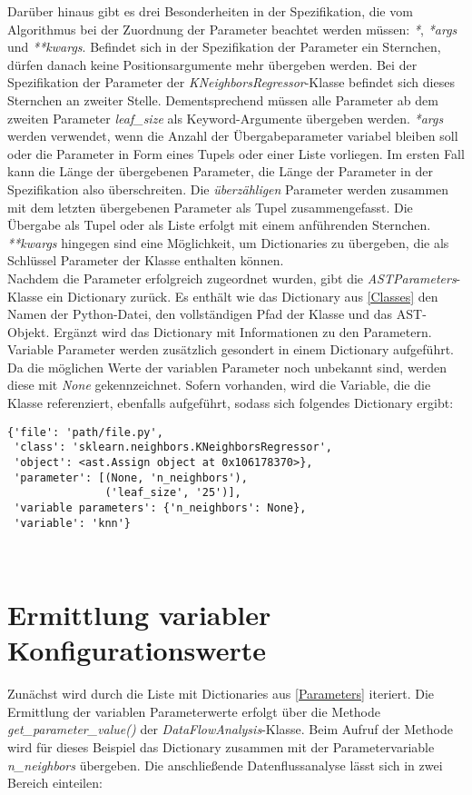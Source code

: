 \documentclass[german,bachelor]{swsLeipzig}
\begin{document}
Darüber hinaus gibt es drei Besonderheiten in der Spezifikation, die vom Algorithmus bei der Zuordnung der Parameter
beachtet werden müssen: \textit{*}, \textit{*args} und \textit{**kwargs}.
Befindet sich in der Spezifikation der Parameter ein Sternchen, dürfen danach keine Positionsargumente mehr
übergeben werden.
Bei der Spezifikation der Parameter der \textit{KNeighborsRegressor}-Klasse befindet sich dieses Sternchen an zweiter Stelle.
Dementsprechend müssen alle Parameter ab dem zweiten Parameter \textit{leaf\_size} als Keyword-Argumente übergeben werden.
\textit{*args} werden verwendet, wenn die Anzahl der Übergabeparameter variabel bleiben soll oder die Parameter in Form
eines Tupels oder einer Liste vorliegen.
Im ersten Fall kann die Länge der übergebenen Parameter, die Länge der Parameter in der Spezifikation also überschreiten.
Die \textit{überzähligen} Parameter werden zusammen mit dem letzten übergebenen Parameter als Tupel zusammengefasst.
Die Übergabe als Tupel oder als Liste erfolgt mit einem anführenden Sternchen.
\textit{**kwargs} hingegen sind eine Möglichkeit, um Dictionaries zu übergeben, die als Schlüssel Parameter der Klasse
enthalten können. \\

Nachdem die Parameter erfolgreich zugeordnet wurden, gibt die \textit{ASTParameters}-Klasse ein Dictionary zurück.
Es enthält wie das Dictionary aus \ref{Classes} den Namen der Python-Datei, den vollständigen Pfad der Klasse und das AST-Objekt.
Ergänzt wird das Dictionary mit Informationen zu den Parametern.
Variable Parameter werden zusätzlich gesondert in einem Dictionary aufgeführt.
Da die möglichen Werte der variablen Parameter noch unbekannt sind, werden diese mit \textit{None} gekennzeichnet.
Sofern vorhanden, wird die Variable, die die Klasse referenziert, ebenfalls aufgeführt, sodass sich folgendes Dictionary ergibt:\\

\begin{lstlisting}[frame=single, basicstyle=\small]
{'file': 'path/file.py',
 'class': 'sklearn.neighbors.KNeighborsRegressor',
 'object': <ast.Assign object at 0x106178370>},
 'parameter': [(None, 'n_neighbors'),
               ('leaf_size', '25')],
 'variable parameters': {'n_neighbors': None},
 'variable': 'knn'}
\end{lstlisting}
\

\section{Ermittlung variabler Konfigurationswerte}
Zunächst wird durch die Liste mit Dictionaries aus \ref{Parameters} iteriert.
Die Ermittlung der variablen Parameterwerte erfolgt über die Methode \textit{get\_parameter\_value()} der \textit{DataFlowAnalysis}-Klasse.
Beim Aufruf der Methode wird für dieses Beispiel das Dictionary zusammen mit der Parametervariable \textit{n\_neighbors} übergeben.
Die anschließende Datenflussanalyse lässt sich in zwei Bereich einteilen:
\end{document}
